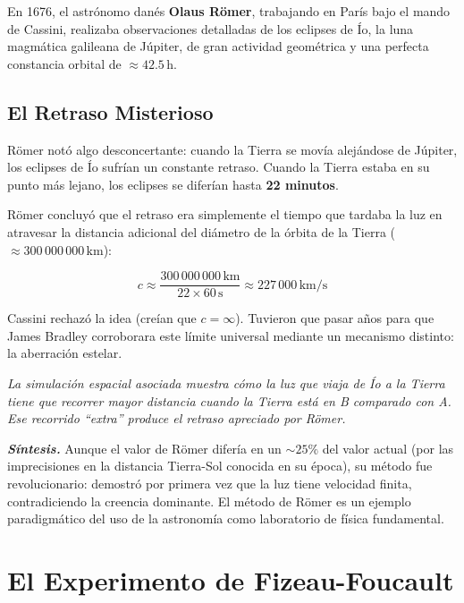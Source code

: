\documentclass[12pt, a4paper]{article}
\theoremstyle{definition}
\newcommand{\nota}[1]{\medskip\noindent\colorbox{grisclaro}{\parbox{0.95\linewidth}{\textit{#1}}}\medskip}
\begin{document}
En 1676, el astrónomo danés \textbf{Olaus Römer}, trabajando en París bajo el mando de
Cassini, realizaba observaciones detalladas de los eclipses de Ío, la luna magmática galileana
de Júpiter, de gran actividad geométrica y una perfecta constancia orbital de
\(\approx 42.5\,\text{h}\).

\subsection{El Retraso Misterioso}

Römer notó algo desconcertante: cuando la Tierra se movía alejándose de Júpiter, los eclipses
de Ío sufrían un constante retraso. Cuando la Tierra estaba en su punto más lejano, los
eclipses se diferían hasta \textbf{22 minutos}.

Römer concluyó que el retraso era simplemente el tiempo que tardaba la luz en atravesar la
distancia adicional del diámetro de la órbita de la Tierra (\(\approx 300\,000\,000\,\text{km}\)):

\begin{equation}
  c \approx \frac{300\,000\,000\,\text{km}}{22 \times 60\,\text{s}} \approx 227\,000\,\text{km/s}
  \label{eq:c_romer}
\end{equation}

Cassini rechazó la idea (creían que \(c = \infty\)). Tuvieron que pasar años para que James
Bradley corroborara este límite universal mediante un mecanismo distinto: la aberración estelar.

\nota{La simulación espacial asociada muestra cómo la luz que viaja de Ío a la Tierra tiene
que recorrer mayor distancia cuando la Tierra está en B comparado con A. Ese recorrido
``extra'' produce el retraso apreciado por Römer.}

\textit{\textbf{Síntesis.}} Aunque el valor de Römer difería en un \(\sim 25\%\) del valor
actual (por las imprecisiones en la distancia Tierra-Sol conocida en su época), su método fue
revolucionario: demostró por primera vez que la luz tiene velocidad finita, contradiciendo la
creencia dominante. El método de Römer es un ejemplo paradigmático del uso de la astronomía
como laboratorio de física fundamental.

\section{El Experimento de Fizeau-Foucault}
\label{sec:fizeau}
\end{document}
